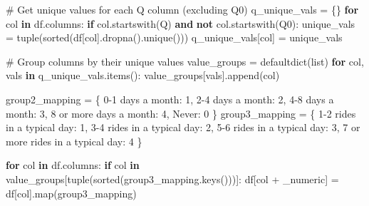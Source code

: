 \documentclass[
  letterpaper,
  DIV=11,
  numbers=noendperiod]{scrartcl}
\newenvironment{Shaded}{\begin{snugshade}}{\end{snugshade}}
\newcommand{\BuiltInTok}[1]{\textcolor[rgb]{0.00,0.23,0.31}{#1}}
\newcommand{\CommentTok}[1]{\textcolor[rgb]{0.37,0.37,0.37}{#1}}
\newcommand{\ControlFlowTok}[1]{\textcolor[rgb]{0.00,0.23,0.31}{\textbf{#1}}}
\newcommand{\DecValTok}[1]{\textcolor[rgb]{0.68,0.00,0.00}{#1}}
\newcommand{\KeywordTok}[1]{\textcolor[rgb]{0.00,0.23,0.31}{\textbf{#1}}}
\newcommand{\NormalTok}[1]{\textcolor[rgb]{0.00,0.23,0.31}{#1}}
\newcommand{\OperatorTok}[1]{\textcolor[rgb]{0.37,0.37,0.37}{#1}}
\newcommand{\StringTok}[1]{\textcolor[rgb]{0.13,0.47,0.30}{#1}}
\begin{document}
\begin{Shaded}
\begin{Highlighting}[]
\CommentTok{\# Get unique values for each Q column (excluding Q0)}
\NormalTok{q\_unique\_vals }\OperatorTok{=}\NormalTok{ \{\}}
\ControlFlowTok{for}\NormalTok{ col }\KeywordTok{in}\NormalTok{ df.columns:}
    \ControlFlowTok{if}\NormalTok{ col.startswith(}\StringTok{\textquotesingle{}Q\textquotesingle{}}\NormalTok{) }\KeywordTok{and} \KeywordTok{not}\NormalTok{ col.startswith(}\StringTok{\textquotesingle{}Q0\textquotesingle{}}\NormalTok{):}
\NormalTok{        unique\_vals }\OperatorTok{=} \BuiltInTok{tuple}\NormalTok{(}\BuiltInTok{sorted}\NormalTok{(df[col].dropna().unique()))}
\NormalTok{        q\_unique\_vals[col] }\OperatorTok{=}\NormalTok{ unique\_vals}

\CommentTok{\# Group columns by their unique values}
\NormalTok{value\_groups }\OperatorTok{=}\NormalTok{ defaultdict(}\BuiltInTok{list}\NormalTok{)}
\ControlFlowTok{for}\NormalTok{ col, vals }\KeywordTok{in}\NormalTok{ q\_unique\_vals.items():}
\NormalTok{    value\_groups[vals].append(col)}



\NormalTok{group2\_mapping }\OperatorTok{=}\NormalTok{ \{}
  \StringTok{\textquotesingle{}0{-}1 days a month\textquotesingle{}}\NormalTok{: }\DecValTok{1}\NormalTok{, }
  \StringTok{\textquotesingle{}2{-}4 days a month\textquotesingle{}}\NormalTok{: }\DecValTok{2}\NormalTok{, }
  \StringTok{\textquotesingle{}4{-}8 days a month\textquotesingle{}}\NormalTok{: }\DecValTok{3}\NormalTok{, }
  \StringTok{\textquotesingle{}8 or more days a month\textquotesingle{}}\NormalTok{: }\DecValTok{4}\NormalTok{, }
  \StringTok{\textquotesingle{}Never\textquotesingle{}}\NormalTok{: }\DecValTok{0}
\NormalTok{\}}
\NormalTok{group3\_mapping }\OperatorTok{=}\NormalTok{ \{}
  \StringTok{\textquotesingle{}1{-}2 rides in a typical day\textquotesingle{}}\NormalTok{: }\DecValTok{1}\NormalTok{, }
  \StringTok{\textquotesingle{}3{-}4 rides in a typical day\textquotesingle{}}\NormalTok{: }\DecValTok{2}\NormalTok{, }
  \StringTok{\textquotesingle{}5{-}6 rides in a typical day\textquotesingle{}}\NormalTok{: }\DecValTok{3}\NormalTok{, }
  \StringTok{\textquotesingle{}7 or more rides in a typical day\textquotesingle{}}\NormalTok{: }\DecValTok{4}
\NormalTok{\}}

\ControlFlowTok{for}\NormalTok{ col }\KeywordTok{in}\NormalTok{ df.columns:}
    \ControlFlowTok{if}\NormalTok{ col }\KeywordTok{in}\NormalTok{ value\_groups[}\BuiltInTok{tuple}\NormalTok{(}\BuiltInTok{sorted}\NormalTok{(group3\_mapping.keys()))]:}
\NormalTok{        df[col }\OperatorTok{+} \StringTok{\textquotesingle{}\_numeric\textquotesingle{}}\NormalTok{] }\OperatorTok{=}\NormalTok{ df[col].}\BuiltInTok{map}\NormalTok{(group3\_mapping)}


\end{Highlighting}
\end{Shaded}
\end{document}
